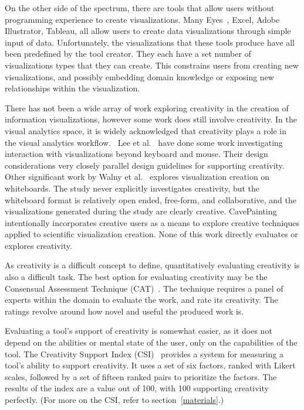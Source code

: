 On the other side of the spectrum, there are tools that allow users without programming experience to create visualizations.
Many Eyes~\cite{viegas2007manyeyes}, Excel, Adobe Illustrator, Tableau, all allow users to create data visualizations through simple input of data.
Unfortunately, the visualizations that these tools produce have all been predefined by the tool creator.
They each have a set number of visualizations types that they can create.
This constrains users from creating new visualizations, and possibly embedding domain knowledge or exposing new relationships within the visualization.

\label{creativitySupport}

There has not been a wide array of work exploring creativity in the creation of information visualizations, however some work does still involve creativity.
In the visual analytics space, it is widely acknowledged that creativity plays a role in the visual analytics workflow.~\cite{scholtz2006beyond}%
Lee et al.~\cite{lee2012beyond} have done some work investigating interaction with visualizations beyond keyboard and mouse.
Their design considerations very closely parallel design guidelines for supporting creativity.
Other significant work by Walny et al.~\cite{walny2011visual} explores visualization creation on whiteboards.
The study never explicitly investigates creativity, but the whiteboard format is relatively open ended, free-form, and collaborative, and the visualizations generated during the study are clearly creative.
CavePainting~\cite{Keefe-2008-SSF} intentionally incorporates creative users as a means to explore creative techniques applied to scientific visualization creation.
None of this work directly evaluates or explores creativity.

As creativity is a difficult concept to define, quantitatively evaluating creativity is also a difficult task.
The best option for evaluating creativity may be the Consensual Assessment Technique (CAT)~\cite{Amabile1996}.
The technique requires a panel of experts within the domain to evaluate the work, and rate its creativity.
The ratings revolve around how novel and useful the produced work is.

Evaluating a tool's support of creativity is somewhat easier, as it does not depend on the abilities or mental state of the user, only on the capabilities of the tool.
The Creativity Support Index (CSI)~\cite{carroll2009creativity} provides a system for measuring a tool's ability to support creativity.
It uses a set of six factors, ranked with Likert scales, followed by a set of fifteen ranked pairs to prioritize the factors.
The results of the index are a value out of 100, with 100 supporting creativity perfectly.
(For more on the CSI, refer to section~\ref{materials}.)

